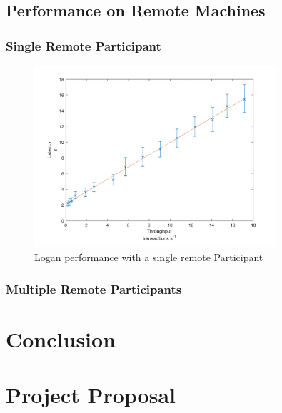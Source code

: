\documentclass[12pt,a4paper,twoside,openright]{report}
\begin{document}
	\section{Performance on Remote Machines}
	\subsection{Single Remote Participant}
	\begin{figure}
		\centering
		\includegraphics[width=0.8\textwidth]{figs/single_remote_worker.png}
		\caption{Logan performance with a single remote Participant}
		\label{figs:singlocal}
	\end{figure}
	\subsection{Multiple Remote Participants}

	\chapter{Conclusion}
	
	
	
	
	
	\appendix

	\chapter{Project Proposal}
	
	
	
	
\end{document}
